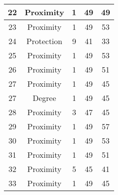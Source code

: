 \documentclass[results.tex]{subfiles}
\begin{document}
\begin{center}
\begin{tabular}{| c || c | c | c | c |}
            \hline
            22                      & Proximity                    & 1                      & 49                      & 49                   \\
            \hline
            23                      & Proximity                    & 1                      & 49                      & 53                   \\
            \hline
            24                      & Protection                   & 9                      & 41                      & 33                   \\
            \hline
            25                      & Proximity                    & 1                      & 49                      & 53                   \\
            \hline
            26                      & Proximity                    & 1                      & 49                      & 51                   \\
            \hline
            27                      & Proximity                    & 1                      & 49                      & 45                   \\
            \hline
            27                      & Degree                       & 1                      & 49                      & 45                   \\
            \hline
            28                      & Proximity                    & 3                      & 47                      & 45                   \\
            \hline
            29                      & Proximity                    & 1                      & 49                      & 57                   \\
            \hline
            30                      & Proximity                    & 1                      & 49                      & 53                   \\
            \hline
            31                      & Proximity                    & 1                      & 49                      & 51                   \\
            \hline
            32                      & Proximity                    & 5                      & 45                      & 41                   \\
            \hline
            33                      & Proximity                    & 1                      & 49                      & 45                   \\

\end{tabular}
\end{center}
\end{document}
